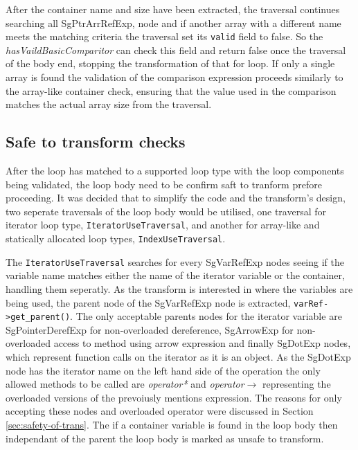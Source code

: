 \documentclass[bsc,frontabs,singlespacing,parskip,deptreport]{infthesis}
\begin{document}
After the container name and size have been extracted, the traversal continues searching all SgPtrArrRefExp, node and if another array with a different name meets the matching criteria the traversal set its \texttt{valid} field to false. So the \textit{hasVaildBasicComparitor} can check this field and return false once the traversal of the body end, stopping the transformation of that for loop. If only a single array is found the validation of the comparison expression proceeds similarly to the array-like container check, ensuring that the value used in the comparison matches the actual array size from the traversal.  

\subsection{Safe to transform checks}

After the loop has matched to a supported loop type with the loop components being validated, the loop body need to be confirm saft to tranform prefore proceeding. It was decided that to simplify the code and the transform's design, two seperate traversals of the loop body would be utilised, one traversal for iterator loop type, \texttt{IteratorUseTraversal}, and another for array-like and statically allocated loop types, \texttt{IndexUseTraversal}. 

The \texttt{IteratorUseTraversal} searches for every SgVarRefExp nodes seeing if the variable name matches either the name of the iterator variable or the container, handling them seperatly. As the transform is interested in where the variables are being used, the parent node of the SgVarRefExp node is extracted, \texttt{varRef->get\_parent()}. The only acceptable parents nodes for the iterator variable are SgPointerDerefExp for non-overloaded dereference, SgArrowExp for non-overloaded access to method using arrow expression and finally SgDotExp nodes, which represent function calls on the iterator as it is an object. As the SgDotExp node has the iterator name on the left hand side of the operation the only allowed methods to be called are \textit{operator*} and \textit{operator$\rightarrow$}    representing the overloaded versions of the prevoiusly mentions expression. The reasons for only accepting these nodes and overloaded operator were discussed in Section \ref{sec:safety-of-trans}. The if a container variable is found in the loop body then independant of the parent the loop body is marked as unsafe to transform.
\end{document}
